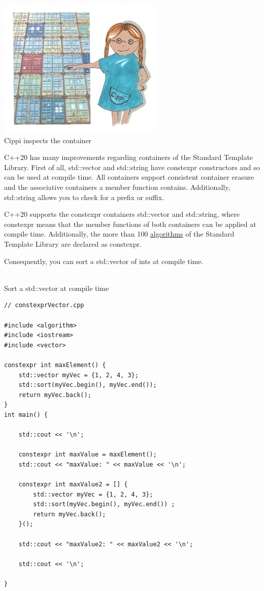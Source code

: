 \begin{center}
\includegraphics[width=0.6\textwidth]{content/3/chapter5/images/10.png}\\
Cippi inspects the container
\end{center}

C++20 has many improvements regarding containers of the Standard Template Library. First of all, std::vector and std::string have constexpr constructors and so can be used at compile time. All containers support consistent container erasure and the associative containers a member function contains. Additionally, std::string allows you to check for a prefix or suffix.


C++20 supports the constexpr containers std::vector and std::string, where constexpr means that the member functions of both containers can be applied at compile time. Additionally, the more than 100 \href{https://en.cppreference.com/w/cpp/algorithm}{algorithms} of the Standard Template Library are declared as constexpr.

Consequently, you can sort a std::vector of ints at compile time.

\hspace*{\fill} \\ %
\noindent
Sort a std::vector at compile time
\begin{lstlisting}[style=styleCXX]
// constexprVector.cpp

#include <algorithm>
#include <iostream>
#include <vector>

constexpr int maxElement() {
	std::vector myVec = {1, 2, 4, 3};
	std::sort(myVec.begin(), myVec.end());
	return myVec.back();
}
int main() {

	std::cout << '\n';
	
	constexpr int maxValue = maxElement();
	std::cout << "maxValue: " << maxValue << '\n';
	
	constexpr int maxValue2 = [] {
		std::vector myVec = {1, 2, 4, 3};
		std::sort(myVec.begin(), myVec.end()) ;
		return myVec.back();
	}();
	
	std::cout << "maxValue2: " << maxValue2 << '\n';
	
	std::cout << '\n';

}
\end{lstlisting}

